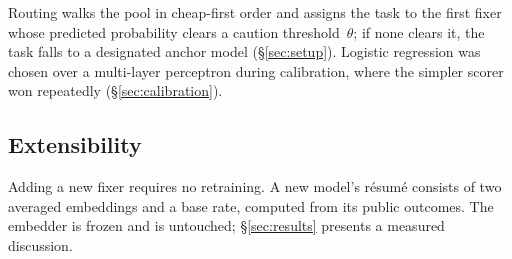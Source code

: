 Routing walks the pool in cheap-first order and assigns the task to the first
fixer whose predicted probability clears a caution threshold~$\theta$; if none
clears it, the task falls to a designated anchor model (\S\ref{sec:setup}).  Logistic regression was chosen
over a multi-layer perceptron during calibration, where the simpler scorer won
repeatedly (\S\ref{sec:calibration}).

\FloatBarrier

\subsection{Extensibility}
\label{sec:extensibility}

Adding a new fixer requires no retraining.  A new model's r\'esum\'e consists
of two averaged embeddings and a base rate, computed from its public outcomes.
The embedder is frozen and \modelname is untouched; \S\ref{sec:results}
presents a measured discussion.
